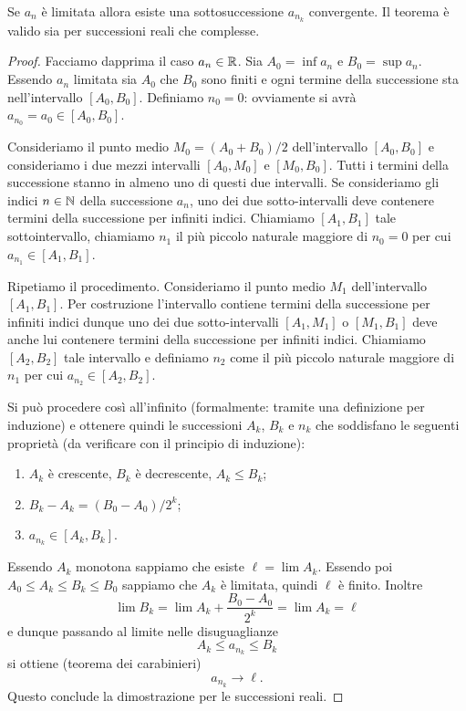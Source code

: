 \begin{theorem}
\mymark{***}
Se $a_n$ è limitata allora esiste una sottosuccessione
$a_{n_k}$ convergente. Il teorema è valido sia per successioni reali
che complesse.
\end{theorem}
%
\begin{proof}
Facciamo dapprima il caso $a_n\in \mathbb R$.
\mymark{***}
Sia $A_0=\inf a_n$ e $B_0=\sup a_n$. Essendo $a_n$ limitata
sia $A_0$
che $B_0$ sono finiti e ogni termine della successione sta
nell'intervallo $[A_0,B_0]$. Definiamo $n_0=0$: ovviamente si avrà $a_{n_0} = a_0 \in [A_0, B_0]$.

Consideriamo il punto medio $M_0 = (A_0+B_0)/2$ dell'intervallo $[A_0,B_0]$ e consideriamo i due mezzi intervalli $[A_0,M_0]$ e $[M_0,B_0]$. Tutti i termini della successione stanno in almeno
uno di questi due intervalli.
Se consideriamo gli indici $n\in \mathbb N$ della successione $a_n$, uno dei due sotto-intervalli deve contenere termini
della successione per infiniti indici.
Chiamiamo $[A_1, B_1]$
tale sottointervallo,
chiamiamo $n_1$ il più piccolo naturale maggiore di $n_0=0$
per cui $a_{n_1} \in [A_1,  B_1]$.

Ripetiamo il procedimento.
Consideriamo il punto medio $M_1$ dell'intervallo $[A_1,B_1]$.
Per costruzione l'intervallo contiene termini della successione
per infiniti indici dunque uno dei due sotto-intervalli $[A_1,M_1]$
o $[M_1,B_1]$ deve anche lui
contenere termini della successione per infiniti indici. Chiamiamo
$[A_2, B_2]$ tale intervallo e definiamo $n_2$ come il più piccolo
naturale maggiore di $n_1$ per cui $a_{n_2}\in [A_2, B_2]$.

Si può procedere così all'infinito (formalmente: tramite una definizione per induzione)
e ottenere quindi le successioni $A_k$, $B_k$ e $n_k$ che soddisfano le seguenti proprietà (da verificare con il principio di induzione):
\begin{enumerate}
\item $A_k$ è crescente, $B_k$ è decrescente, $A_k \le B_k$;
\item $B_k - A_k = (B_0-A_0)/2^k$;
\item $a_{n_k} \in [A_k, B_k]$.
\end{enumerate}

Essendo $A_k$ monotona sappiamo che esiste $\ell = \lim A_k$. Essendo poi $A_0 \le A_k \le B_k \le B_0$ sappiamo che $A_k$ è limitata, quindi $\ell$ è finito.
Inoltre
\[
 \lim B_k = \lim A_k + \frac{B_0-A_0}{2^k} = \lim A_k = \ell
 \]
 e dunque
passando al limite nelle disuguaglianze
\[
   A_k \le a_{n_k} \le B_k
\]
si ottiene (teorema dei carabinieri)
\[
  a_{n_k} \to \ell.
\]
Questo conclude la dimostrazione per le successioni reali.


\end{proof}
